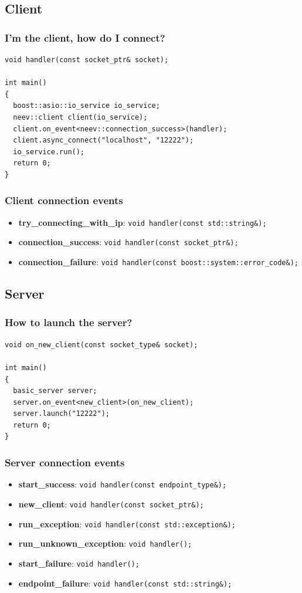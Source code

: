 \documentclass[xcolor=dvipsnames]{beamer}
\begin{document}
\subsection{Client}
\begin{frame}[fragile]
\frametitle{I'm the client, how do I connect?}
\begin{lstlisting}
void handler(const socket_ptr& socket);

int main()
{
  boost::asio::io_service io_service;
  neev::client client(io_service);
  client.on_event<neev::connection_success>(handler);
  client.async_connect("localhost", "12222");
  io_service.run();
  return 0;
}
\end{lstlisting}
\end{frame}

\begin{frame}
\frametitle{Client connection events}
\begin{itemize}
  \item \textbf{try\_connecting\_with\_ip}: \lstinline{void handler(const std::string&);}
  \item \textbf{connection\_success}: \lstinline{void handler(const socket_ptr&);}
  \item \textbf{connection\_failure}: \lstinline{void handler(const boost::system::error_code&);}
\end{itemize}
\end{frame}

\subsection{Server}
\begin{frame}[fragile]
\frametitle{How to launch the server?}
\begin{lstlisting}
void on_new_client(const socket_type& socket);

int main()
{
  basic_server server;
  server.on_event<new_client>(on_new_client);
  server.launch("12222");
  return 0;
}
\end{lstlisting}
\end{frame}

\begin{frame}
\frametitle{Server connection events}
\begin{itemize}
  \item \textbf{start\_success}: \lstinline{void handler(const endpoint_type&);}
  \item \textbf{new\_client}: \lstinline{void handler(const socket_ptr&);}
  \item \textbf{run\_exception}: \lstinline{void handler(const std::exception&);}
  \item \textbf{run\_unknown\_exception}: \lstinline{void handler();}
  \item \textbf{start\_failure}: \lstinline{void handler();}
  \item \textbf{endpoint\_failure}: \lstinline{void handler(const std::string&);}
\end{itemize}
\end{frame}
\end{document}
